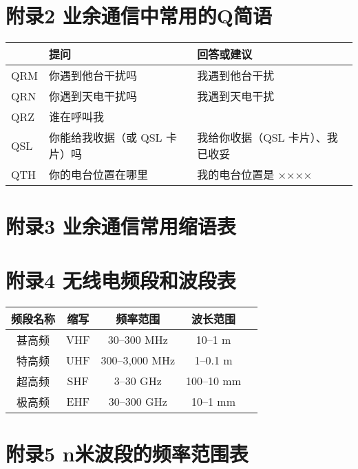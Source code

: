 \newpage

\section{附录2 业余通信中常用的Q简语}

\begin{tabular}{|l|l|l|}
	\hline
	    & \textbf{提问} & \textbf{回答或建议} \\
	\hline
	QRM & 你遇到他台干扰吗 & 我遇到他台干扰 \\
	\hline
	QRN & 你遇到天电干扰吗 & 我遇到天电干扰 \\
	\hline
	QRZ & 谁在呼叫我 & \\
	\hline
	QSL & 你能给我收据（或 QSL 卡片）吗 & 我给你收据（QSL 卡片）、我已收妥 \\
	\hline
	QTH & 你的电台位置在哪里 & 我的电台位置是 ×××× \\
	\hline
\end{tabular}

\newpage



\section{附录3 业余通信常用缩语表}




\newpage

\section{附录4 无线电频段和波段表}

\begin{tabular}{|c|c|c|c|c|}
	\hline
	\textbf{频段名称} & \textbf{缩写} & \textbf{频率范围} & \textbf{波长范围} \\
	\hline
	甚高频 & VHF & 30–300 MHz & 10–1 m \\
	\hline
	特高频 & UHF & 300–3,000 MHz & 1–0.1 m \\
	\hline
	超高频 & SHF & 3–30 GHz & 100–10 mm \\
	\hline
	极高频 & EHF & 30–300 GHz & 10–1 mm \\
	\hline
\end{tabular}

\newpage






\section{附录5 n米波段的频率范围表}


